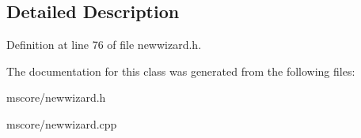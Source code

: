 \subsection{Detailed Description}


Definition at line 76 of file newwizard.\+h.



The documentation for this class was generated from the following files\+:\begin{DoxyCompactItemize}
\item 
mscore/newwizard.\+h\item 
mscore/newwizard.\+cpp\end{DoxyCompactItemize}

